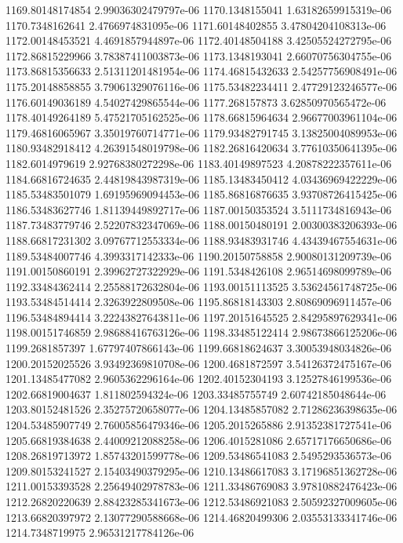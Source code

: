 {1169.80148174854 2.99036302479797e-06
1170.1348155041 1.63182659915319e-06
1170.7348162641 2.4766974831095e-06
1171.60148402855 3.47804204108313e-06
1172.00148453521 4.4691857944897e-06
1172.40148504188 3.42505524272795e-06
1172.86815229966 3.78387411003873e-06
1173.1348193041 2.66070756304755e-06
1173.86815356633 2.51311201481954e-06
1174.46815432633 2.54257756908491e-06
1175.20148858855 3.79061329076116e-06
1175.53482234411 2.47729123246577e-06
1176.60149036189 4.54027429865544e-06
1177.268157873 3.62850970565472e-06
1178.40149264189 5.47521705162525e-06
1178.66815964634 2.96677003961104e-06
1179.46816065967 3.35019760714771e-06
1179.93482791745 3.13825004089953e-06
1180.93482918412 4.26391548019798e-06
1182.26816420634 3.77610350641395e-06
1182.6014979619 2.92768380272298e-06
1183.40149897523 4.20878222357611e-06
1184.66816724635 2.44819843987319e-06
1185.13483450412 4.03436969422229e-06
1185.53483501079 1.69195969094453e-06
1185.86816876635 3.93708726415425e-06
1186.53483627746 1.81139449892717e-06
1187.00150353524 3.5111734816943e-06
1187.73483779746 2.52207832347069e-06
1188.00150480191 2.00300383206393e-06
1188.66817231302 3.09767712553334e-06
1188.93483931746 4.43439467554631e-06
1189.53484007746 4.3993317142333e-06
1190.20150758858 2.90080131209739e-06
1191.00150860191 2.39962727322929e-06
1191.5348426108 2.96514698099789e-06
1192.33484362414 2.25588172632804e-06
1193.00151113525 3.53624561748725e-06
1193.53484514414 2.3263922809508e-06
1195.86818143303 2.80869096911457e-06
1196.53484894414 3.22243827643811e-06
1197.20151645525 2.84295897629341e-06
1198.00151746859 2.98688416763126e-06
1198.33485122414 2.98673866125206e-06
1199.2681857397 1.67797407866143e-06
1199.66818624637 3.30053948034826e-06
1200.20152025526 3.93492369810708e-06
1200.4681872597 3.54126372475167e-06
1201.13485477082 2.9605362296164e-06
1202.40152304193 3.12527846199536e-06
1202.66819004637 1.811802594324e-06
1203.33485755749 2.60742185048644e-06
1203.80152481526 2.35275720658077e-06
1204.13485857082 2.71286236398635e-06
1204.53485907749 2.76005856479346e-06
1205.2015265886 2.91352381727541e-06
1205.66819384638 2.44009212088258e-06
1206.4015281086 2.65717176650686e-06
1208.26819713972 1.85743201599778e-06
1209.53486541083 2.5495293536573e-06
1209.80153241527 2.15403490379295e-06
1210.13486617083 3.17196851362728e-06
1211.00153393528 2.25649402978783e-06
1211.33486769083 3.97810882476423e-06
1212.26820220639 2.88423285341673e-06
1212.53486921083 2.50592327009605e-06
1213.66820397972 2.13077290588668e-06
1214.46820499306 2.03553133341746e-06
1214.7348719975 2.96531217784126e-06
}
